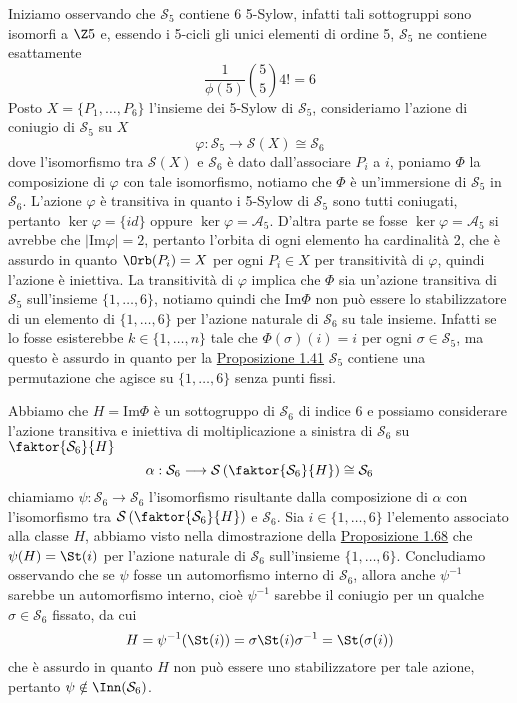 \documentclass[11pt]{scrartcl}
\begin{document}
Iniziamo osservando che $\mathcal{S}_5$ contiene 6 5-Sylow, infatti tali sottogruppi 
sono isomorfi a $\Z5$ e, essendo i 5-cicli gli unici elementi di ordine 5,
$\mathcal{S}_5$ ne contiene esattamente 
\[
    \frac{1}{\phi(5)} \binom{5}{5}4! = 6
\]
Posto $X = \{P_1, \ldots, P_6\}$ l'insieme dei 5-Sylow di $\mathcal{S}_5$, consideriamo l'azione di coniugio 
di $\mathcal{S}_5$ su $X$
\[
    \varphi: \mathcal{S}_5 \longrightarrow \mathcal{S}(X) \cong \mathcal{S}_6
\]
dove l'isomorfismo tra $\mathcal{S}(X)$ e $\mathcal{S}_6$ è dato dall'associare $P_i$ a $i$, 
poniamo $\Phi$ la composizione di $\varphi$ con tale isomorfismo, notiamo
che $\Phi$ è un'immersione di $\mathcal{S}_5$ in $\mathcal{S}_6$. L'azione 
$\varphi$ è transitiva in quanto i 5-Sylow di $\mathcal{S}_5$ sono tutti coniugati,
pertanto $\ker\varphi = \{id\}$ oppure $\ker\varphi = \mathcal{A}_5$. D'altra parte
se fosse $\ker\varphi = \mathcal{A}_5$ si avrebbe che $|\mathrm{Im}\varphi| = 2$,
pertanto l'orbita di ogni elemento ha cardinalità 2, che è assurdo in quanto
$\Orb(P_i) = X$ per ogni $P_i \in X$ per transitività di $\varphi$, quindi l'azione
è iniettiva.\newline
La transitività di $\varphi$ implica che $\Phi$ sia un'azione transitiva
di $\mathcal{S}_5$ sull'insieme $\{1, \ldots, 6\}$, notiamo quindi che $\mathrm{Im}\Phi$
non può essere lo stabilizzatore di un elemento di $\{1, \ldots, 6\}$
per l'azione naturale di $\mathcal{S}_6$ su tale insieme. Infatti se lo fosse esisterebbe
$k \in \{1, \ldots, n\}$ tale che $\Phi(\sigma)(i) = i$ per ogni $\sigma \in \mathcal{S}_5$,
ma questo è assurdo in quanto per la \hyperref[prop1.41]{Proposizione 1.41} 
$\mathcal{S}_5$ contiene una permutazione che agisce su $\{1, \ldots, 6\}$ senza punti
fissi.

Abbiamo che $H = \mathrm{Im}\Phi$ è un sottogruppo di $\mathcal{S}_6$ di indice $6$ e possiamo
considerare l'azione transitiva e iniettiva di moltiplicazione a sinistra di $\mathcal{S}_6$ su 
$\faktor{\mathcal{S}_6}{H}$
\[
    \alpha: \mathcal{S}_6\longrightarrow\mathcal{S}\left(\faktor{\mathcal{S}_6}{H}\right) \cong \mathcal{S}_6
\]
chiamiamo $\psi: \mathcal{S}_6\longrightarrow \mathcal{S}_6$ l'isomorfismo risultante dalla
composizione di $\alpha$ con l'isomorfismo tra $\mathcal{S}\left(\faktor{\mathcal{S}_6}{H}\right)$
e $\mathcal{S}_6$. Sia $i \in \{1, \ldots, 6\}$ l'elemento associato alla classe $H$,
abbiamo visto nella dimostrazione della \hyperref[prop1.68]{Proposizione 1.68}
che $\psi(H) = \St(i)$ per l'azione naturale di $\mathcal{S}_6$ sull'insieme $\{1, \ldots, 6\}$.
Concludiamo osservando che se $\psi$ fosse un automorfismo interno di $\mathcal{S}_6$,
allora anche $\psi^{-1}$ sarebbe un automorfismo interno, cioè $\psi^{-1}$
sarebbe il coniugio per un qualche $\sigma \in \mathcal{S}_6$ fissato, da cui
\[
    H = \psi^{-1}(\St(i)) = \sigma\St(i)\sigma^{-1} = \St(\sigma(i))
\]
che è assurdo in quanto $H$ non può essere uno stabilizzatore per tale azione,
pertanto $\psi \notin \Inn(\mathcal{S}_6)$.
\end{document}
